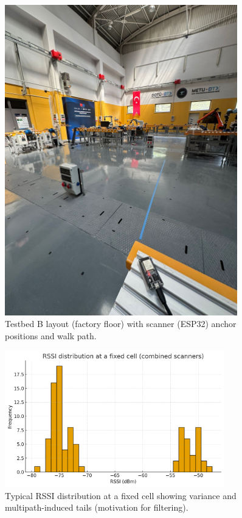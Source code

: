 \documentclass[a4paper,12pt]{report}
\begin{document}
\begin{figure}[H]
    \centering
    \includegraphics[width=0.9\textwidth]{figures/layout_grid_testbedB.png}
    \caption{Testbed B layout (factory floor) with scanner (ESP32) anchor positions and walk path.}
    \label{fig:testbedB_layout}
\end{figure}

\begin{figure}[H]
    \centering
    \includegraphics[width=0.85\textwidth]{figures/rssi_noise_histogram.png}
    \caption{Typical RSSI distribution at a fixed cell showing variance and multipath-induced tails (motivation for filtering).}
    \label{fig:rssi_hist}
\end{figure}
\end{document}
